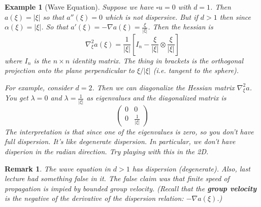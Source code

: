 \documentclass{article}
\newtheorem{remark}{Remark}
\newtheorem{example}{Example}
\begin{document}
\begin{example}[Wave Equation]
  Suppose we have $\square u = 0$ with $d=1$. Then $a(\xi) = |\xi|$ so that
  $a''(\xi)=0$ which is not dispersive. But if $d>1$ then since
  $\alpha(\xi)=|\xi|$. So that
  $a'(\xi)= -\nabla a(\xi)= \frac{\xi}{\left| \xi \right|}$. Then the hessian is
  \begin{equation*}
    \nabla^{2}_{\xi} a(\xi) 
    = \frac{1}{\left| \xi \right|}\left[ I_{n}-\frac{\xi}{|\xi|}\otimes \frac{\xi}{|\xi|} \right] 
  \end{equation*}
  where $I_{n}$ is the $n\times n$ identity matrix. The thing in brackets is the
  orthogonal projection onto the plane perpendicular to $\xi/|\xi|$ (i.e.
  tangent to the sphere).

  For example, consider $d=2$. Then we can diagonalize the Hessian matrix
  $\nabla^{2}_{\xi}a$.  You get $\lambda=0$ and $\lambda= \frac{1}{|\xi|}$ as
  eigenvalues and the diagonalized matrix is
  \begin{equation*}
    \begin{pmatrix}
      0&0\\
      0&\frac{1}{|\xi|}
    \end{pmatrix}
  \end{equation*}
  The interpretation is that since one of the eigenvalues is zero, so you don't
  have full dispersion. It's like degenerate dispersion. In particular, we don't
  have disperion in the radian direction. Try playing with this in the 2D. 
\end{example}
\begin{remark}
  The wave equation in $d>1$ has dispersion (degenerate). Also, last lecture had
  something false in it. The false claim was that finite speed of propagation is
  impied by bounded group velocity. (Recall that the \textbf{group velocity} is
  the negative of the derivative of the dispersion relation: $-\nabla a(\xi)$.) 
\end{remark}
\end{document}

